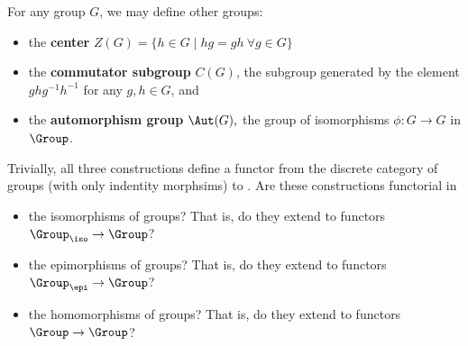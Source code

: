 \documentclass[main.tex]{subfiles}
\begin{document}
\begin{exercise}
For any group $G$, we may define other groups:
\begin{itemize}
    \item the \textbf{center} $Z(G) = \{h \in G \mid hg = gh\ \forall g\in G\}$
	\item the \textbf{commutator subgroup} $C(G)$, the subgroup generated by the
		element $ghg^{-1}h^{-1}$ for any $g,h \in G$, and
	\item the \textbf{automorphism group} $ \Aut(G), $ the group of isomorphisms
		$\phi\colon G \rightarrow G$ in $\Group$.
\end{itemize}
Trivially, all three constructions define a functor from the discrete category of groups (with only indentity morphsims) to \Group. Are these constructions functorial in
\begin{itemize}
	\item the isomorphisms of groups? That is, do they extend to functors
		$\Group_{\iso} \rightarrow \Group$?
	\item the epimorphisms of groups? That is, do they extend to functors
		$\Group_{\epi} \rightarrow \Group$?
	\item the homomorphisms of groups? That is, do they extend to functors
		$\Group \rightarrow \Group$?
\end{itemize}
\end{exercise}
\end{document}
